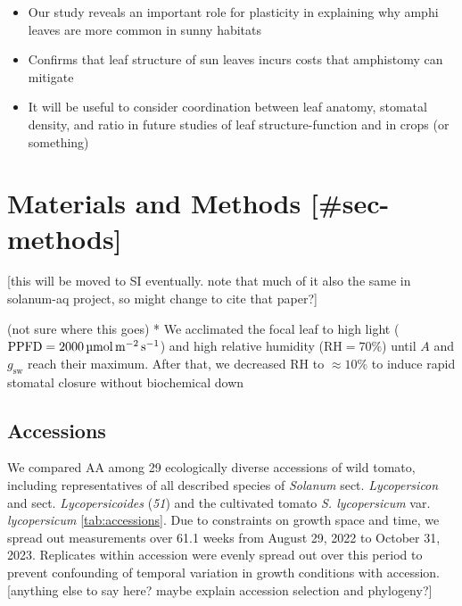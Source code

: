 \documentclass[
  letterpaper,
  DIV=11,
  numbers=noendperiod]{scrartcl}
\providecommand{\tightlist}{%
  \setlength{\itemsep}{0pt}\setlength{\parskip}{0pt}}\usepackage{longtable,booktabs,array}
\newcommand{\gsw}{$g_\text{sw}$}
\newcommand{\ppfdequals}[1]{$\mathrm{PPFD} = \qty{#1}{\micro\mol\raiseto{-2}\meter\raiseto{-1}\second}$}
\newcommand{\rh}{$\mathrm{RH}$}
\newcommand{\rhequals}[1]{$\mathrm{RH} = #1\%$}
\begin{document}
\begin{itemize}
\tightlist
\item
  Our study reveals an important role for plasticity in explaining why
  amphi leaves are more common in sunny habitats
\item
  Confirms that leaf structure of sun leaves incurs costs that
  amphistomy can mitigate
\item
  It will be useful to consider coordination between leaf anatomy,
  stomatal density, and ratio in future studies of leaf
  structure-function and in crops (or something)
\end{itemize}

\section{Materials and Methods
{[}\#sec-methods{]}}\label{materials-and-methods-sec-methods}

{[}this will be moved to SI eventually. note that much of it also the
same in solanum-aq project, so might change to cite that paper?{]}

(not sure where this goes) * We acclimated the focal leaf to high light
(\ppfdequals{2000}) and high relative humidity (\rhequals{70}) until
\(A\) and \gsw{} reach their maximum. After that, we decreased \rh{} to
\(\approx 10\%\) to induce rapid stomatal closure without biochemical
down

\subsection{Accessions}\label{accessions}

We compared AA among 29 ecologically diverse accessions of wild tomato,
including representatives of all described species of \emph{Solanum}
sect. \emph{Lycopersicon} and sect. \emph{Lycopersicoides} (\emph{51})
and the cultivated tomato \emph{S. lycopersicum} var.
\emph{lycopersicum} \autoref{tab:accessions}. Due to constraints on
growth space and time, we spread out measurements over 61.1 weeks from
August 29, 2022 to October 31, 2023. Replicates within accession were
evenly spread out over this period to prevent confounding of temporal
variation in growth conditions with accession. {[}anything else to say
here? maybe explain accession selection and phylogeny?{]}
\end{document}
